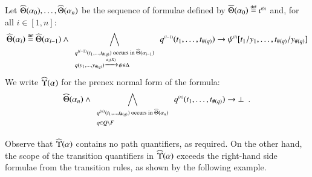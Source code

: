 \documentclass{llncs}
\begin{document}
\begin{definition}\label{def:quantform}
  Let $\widehat{\Theta}({\alpha_0}), \ldots, \widehat{\Theta}({\alpha_n})$ be the
  sequence of formulae defined by $\widehat{\Theta}({\alpha_0}) \stackrel{\scriptscriptstyle{\mathsf{def}}}{=}
  {\iota}^{\scriptscriptstyle{({0})}}$ and, for all $i \in [1,n]$:
  \[\widehat{\Theta}({\alpha_i}) \stackrel{\scriptscriptstyle{\mathsf{def}}}{=} \widehat{\Theta}({\alpha_{i-1}}) \wedge
  \bigwedge_{\begin{array}{l}
      \scriptstyle{{q}^{\scriptscriptstyle{({i-1})}}(t_1,\ldots,t_{\#(q)}) \text{ occurs in } \widehat{\Theta}({\alpha_{i-1}})} \\
      \scriptstyle{q(y_1,\ldots,y_{\#(q)}) \xrightarrow{{\scriptscriptstyle a_i(X)}}_{{\scriptstyle }} \psi \in \Delta} 
  \end{array}} {q}^{\scriptscriptstyle{({i-1})}}(t_1,\ldots,t_{\#(q)}) \rightarrow 
    {\psi}^{\scriptscriptstyle{({i})}}[t_1/y_1, \ldots, t_{\#(q)}/y_{\#(q)}]
      \]  We write
    $\widehat{\Upsilon}({\alpha})$ for the prenex normal form of the formula: 
      \[\widehat{\Theta}({\alpha_n}) \wedge \bigwedge_{\begin{array}{l}
          \scriptstyle{{q}^{\scriptscriptstyle{({n})}}(t_1,\ldots,t_{\#(q)}) \text{ occurs in } \widehat{\Theta}({\alpha_n})} \\
          \scriptstyle{q \in Q \setminus F}
      \end{array}} {q}^{\scriptscriptstyle{({n})}}(t_1,\ldots,t_{\#(q)}) \rightarrow \bot \enspace.\]
\end{definition}
Observe that $\widehat{\Upsilon}({\alpha})$ contains no path quantifiers, as
required. On the other hand, the scope of the transition quantifiers
in $\widehat{\Upsilon}({\alpha})$ exceeds the right-hand side formulae from the
transition rules, as shown by the following example. 
\end{document}
